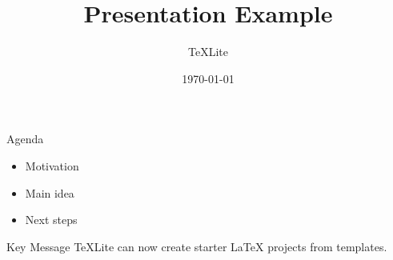 \documentclass{beamer}
\title{Presentation Example}
\author{TeXLite}
\date{\today}
\begin{document}
\frame{\titlepage}

\begin{frame}{Agenda}
    \begin{itemize}
        \item Motivation
        \item Main idea
        \item Next steps
    \end{itemize}
\end{frame}

\begin{frame}{Key Message}
    TeXLite can now create starter LaTeX projects from templates.
\end{frame}
\end{document}

